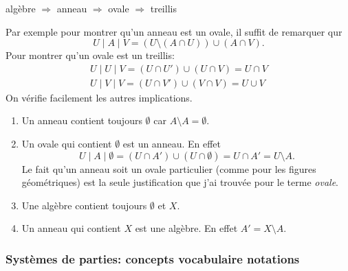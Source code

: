 \begin{prop}
  algèbre $\Rightarrow$ anneau $\Rightarrow$ ovale $\Rightarrow$ treillis
\end{prop}
\begin{demo}
Par exemple pour montrer qu'un anneau est un ovale, il suffit de remarquer qur
\begin{displaymath}
  U \mid A \mid V = (U \setminus (A \cap U)) \cup (A \cap V).
\end{displaymath}
Pour montrer qu'un ovale est un treillis:
\begin{align*}
  U \mid U \mid V = (U \cap U') \cup (U \cap V) = U \cap V \\
  U \mid V \mid V = (U \cap V') \cup (V \cap V) = U \cup V
\end{align*}
On vérifie facilement les autres implications.
\end{demo}

\begin{rems}
 \begin{enumerate}
  \item Un anneau contient toujours $\emptyset$ car $A \setminus A = \emptyset$.
  \item Un ovale qui contient $\emptyset$ est un anneau. En effet
    \begin{displaymath}
      U \mid A \mid \emptyset = (U \cap A')\cup (U \cap \emptyset) = U \cap A' = U \setminus A.
    \end{displaymath}
    Le fait qu'un anneau soit un ovale particulier (comme pour les figures géométriques) est la seule justification que j'ai trouvée pour le terme \emph{ovale}.
  \item Une algèbre contient toujours $\emptyset$ et $X$.
  \item Un anneau qui contient $X$ est une algèbre. En effet $A' = X \setminus A$.
 \end{enumerate}
\end{rems}

\subsubsection{Systèmes de parties: concepts vocabulaire notations}\label{types cardinalité}

